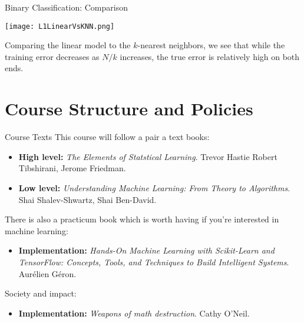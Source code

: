 \documentclass[10pt, handout]{beamer}
\begin{document}
\begin{frame}[fragile]{Binary Classification: Comparison}
  \begin{minipage}[t][0.7\textheight][t]{\textwidth}
    \centering
     \texttt{[image: L1LinearVsKNN.png]}
  \end{minipage}
  \vfill
  \begin{minipage}[t][0.3\textheight][t]{\textwidth}
Comparing the linear model to the $k$-nearest neighbors, we see that while the training error decreases as $N/k$ increases, the true error is relatively high on both ends. 
 \end{minipage}
\end{frame}






\section{Course Structure and Policies}

\begin{frame}[fragile]{Course Texts}
This course will follow a pair a text books:

\begin{itemize}[label={}]
\item \textbf{High level:} \textit{The Elements of Statstical Learning}. Trevor Hastie Robert Tibshirani, Jerome Friedman. 

\item \textbf{Low level:} \textit{Understanding Machine Learning: From Theory to Algorithms}. Shai Shalev-Shwartz, Shai Ben-David.

\end{itemize}

There is also a practicum book which is worth having if you're interested in machine learning:

\begin{itemize}[label={}]
\item \textbf{Implementation:} \textit{Hands-On Machine Learning with Scikit-Learn and TensorFlow: Concepts, Tools, and Techniques to Build Intelligent Systems}. Aurélien Géron. 
\end{itemize}

Society and impact:

\begin{itemize}[label={}]
\item \textbf{Implementation:} \textit{Weapons of math destruction}. Cathy O'Neil.
\end{itemize}
\end{frame}
\end{document}
